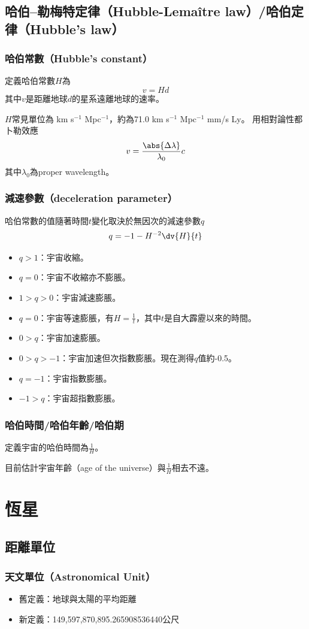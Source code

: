 \documentclass[a4paper,12pt]{report}
\begin{document}
\subsection{哈伯–勒梅特定律（Hubble-Lemaître law）/哈伯定律（Hubble's law）}
\subsubsection{哈伯常數（Hubble's constant）}
定義哈伯常數$H$為
\[v=Hd\]
其中$v$是距離地球$d$的星系遠離地球的速率。

$H$常見單位為 km s$^{-1}$ Mpc$^{-1}$，約為71.0 km s$^{-1}$ Mpc$^{-1}$ mm/s Ly。
用相對論性都卜勒效應
\[v=\frac{\abs{\Delta\lambda}}{\lambda_0}c\]
其中$\lambda_0$為proper wavelength。
\subsubsection{減速參數（deceleration parameter）}
哈伯常數的值隨著時間$t$變化取決於無因次的減速參數$q$
\[q=-1-H^{-2}\dv{H}{t}\]
\begin{itemize}
\item $q>1$：宇宙收縮。
\item $q=0$：宇宙不收縮亦不膨脹。
\item $1>q>0$：宇宙減速膨脹。
\item $q=0$：宇宙等速膨脹，有$H = \frac{1}{t}$，其中$t$是自大霹靂以來的時間。
\item $0>q$：宇宙加速膨脹。
\item $0>q>-1$：宇宙加速但次指數膨脹。現在測得$q$值約-0.5。
\item $q=-1$：宇宙指數膨脹。
\item $-1>q$：宇宙超指數膨脹。
\end{itemize}
\subsubsection{哈伯時間/哈伯年齡/哈伯期}
定義宇宙的哈伯時間為$\frac{1}{H}$。

目前估計宇宙年齡（age of the universe）與$\frac{1}{H}$相去不遠。
\section{恆星}
\subsection{距離單位}
\subsubsection{天文單位（Astronomical Unit）}
\begin{itemize}
    \item 舊定義：地球與太陽的平均距離
    \item 新定義：149,597,870,895.265908536440公尺
\end{itemize}
\end{document}
